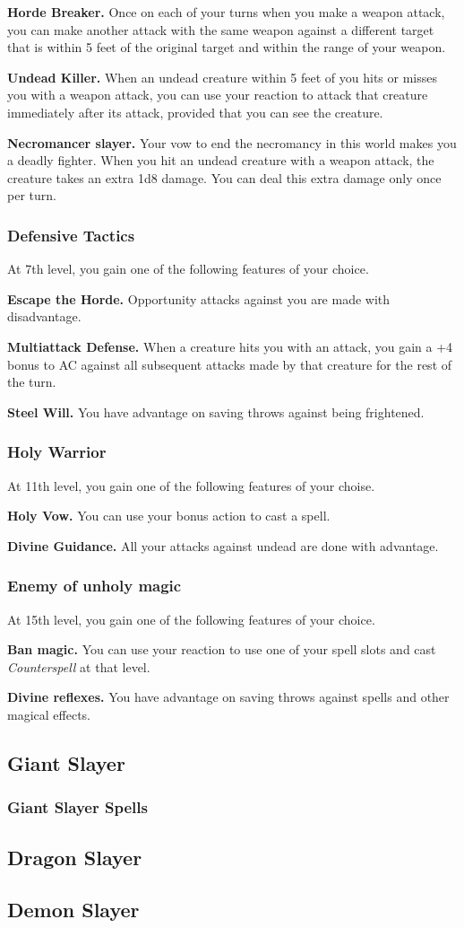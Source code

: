 \documentclass[11pt,a4paper,twocolumn, sans]{article}
\begin{document}
	\textbf{Horde Breaker.} Once on each of your turns when you make a weapon attack, you can make another attack with the same weapon against a different target that is within 5 feet of the original target and within the range of your weapon.
	
	\textbf{Undead Killer.} When an undead creature within 5 feet of you hits or misses you with a weapon attack, you can use your reaction to attack that creature immediately after its attack, provided that you can see the creature.
	
	\textbf{Necromancer slayer.} Your vow to end the necromancy in this world makes you a deadly fighter. When you hit an undead creature with a weapon attack, the creature takes an extra 1d8 damage. You can deal this extra damage only once per turn.
	
	\subsubsection*{Defensive Tactics}
	At 7th level, you gain one of the following features of your choice.
	
	\textbf{Escape the Horde.} Opportunity attacks against you are made with disadvantage.
	
	\textbf{Multiattack Defense.} When a creature hits you with an attack, you gain a +4 bonus to AC against all subsequent attacks made by that creature for the rest of the turn.
	
	\textbf{Steel Will.} You have advantage on saving throws against being frightened.
	
	\subsubsection*{Holy Warrior}
	At 11th level, you gain one of the following features of your choise.
	
	\textbf{Holy Vow.} You can use your bonus action to cast a spell.
	
	\textbf{Divine Guidance.} All your attacks against undead are done with advantage.
	
	\subsubsection*{Enemy of unholy magic}
	At 15th level, you gain one of the following features of your choice.
	
	\textbf{Ban magic.} You can use your reaction to use one of your spell slots and cast \textit{Counterspell} at that level.
	
	\textbf{Divine reflexes.} You have advantage on saving throws against spells and other magical effects.
	
	\subsection*{Giant Slayer}
	\subsubsection*{Giant Slayer Spells}
	\subsection*{Dragon Slayer}
	\subsection*{Demon Slayer}
\end{document}
